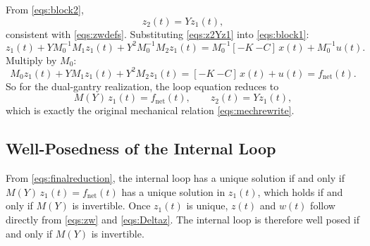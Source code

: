 \documentclass[11pt]{article}
\newcommand{\R}{\mathbb{R}}
\begin{document}
From \eqref{eqs:block2},
\begin{equation}
    z_2(t) = Y z_1(t),
    \label{eqs:z2Yz1}
\end{equation}
consistent with \eqref{eqs:zwdefs}. Substituting \eqref{eqs:z2Yz1} into \eqref{eqs:block1}:
\begin{equation}
    z_1(t) + Y M_0^{-1}M_1 z_1(t) + Y^2 M_0^{-1}M_2 z_1(t)
    = M_0^{-1}[-K\ {-C}]\,x(t) + M_0^{-1}u(t).
    \label{eqs:z1reduced1}
\end{equation}
Multiply by $M_0$:
\begin{equation}
    M_0 z_1(t) + Y M_1 z_1(t) + Y^2 M_2 z_1(t) = [-K\ {-C}]\,x(t) + u(t) = f_{\mathrm{net}}(t).
    \label{eqs:z1reduced2}
\end{equation}
So for the dual-gantry realization, the loop equation reduces to
\begin{equation}
    M(Y)\,z_1(t) = f_{\mathrm{net}}(t),
    \qquad
    z_2(t) = Y z_1(t),
    \label{eqs:finalreduction}
\end{equation}
which is exactly the original mechanical relation \eqref{eqs:mechrewrite}.

\subsection{Well-Posedness of the Internal Loop}
From \eqref{eqs:finalreduction}, the internal loop has a unique solution if and
only if $M(Y)\,z_1(t) = f_{\mathrm{net}}(t)$ has a unique solution in $z_1(t)$, which holds
if and only if $M(Y)$ is invertible. Once $z_1(t)$ is unique, $z(t)$ and $w(t)$ follow directly from \eqref{eqs:zw} and
\eqref{eqs:Deltaz}. The internal loop is therefore well posed if and only if
$M(Y)$ is invertible.



\end{document}

